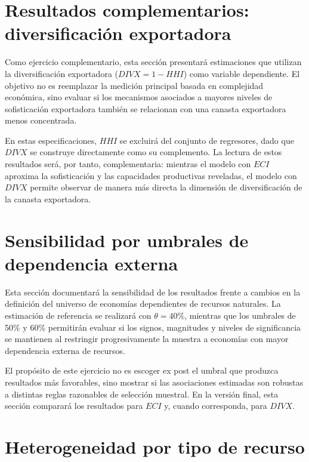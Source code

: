 \documentclass[../../PTFM.tex]{subfiles}
\begin{document}
	\section{Resultados complementarios: diversificación exportadora}
	\label{sec:resultados-divx}

	Como ejercicio complementario, esta sección presentará estimaciones que utilizan la diversificación exportadora ($DIVX=1-HHI$) como variable dependiente. El objetivo no es reemplazar la medición principal basada en complejidad económica, sino evaluar si los mecanismos asociados a mayores niveles de sofisticación exportadora también se relacionan con una canasta exportadora menos concentrada.

	En estas especificaciones, $HHI$ se excluirá del conjunto de regresores, dado que $DIVX$ se construye directamente como su complemento. La lectura de estos resultados será, por tanto, complementaria: mientras el modelo con $ECI$ aproxima la sofisticación y las capacidades productivas reveladas, el modelo con $DIVX$ permite observar de manera más directa la dimensión de diversificación de la canasta exportadora.


	\section{Sensibilidad por umbrales de dependencia externa}
	\label{sec:sensibilidad-umbrales}

	Esta sección documentará la sensibilidad de los resultados frente a cambios en la definición del universo de economías dependientes de recursos naturales. La estimación de referencia se realizará con $\theta=40\%$, mientras que los umbrales de 50\% y 60\% permitirán evaluar si los signos, magnitudes y niveles de significancia se mantienen al restringir progresivamente la muestra a economías con mayor dependencia externa de recursos.

	El propósito de este ejercicio no es escoger ex post el umbral que produzca resultados más favorables, sino mostrar si las asociaciones estimadas son robustas a distintas reglas razonables de selección muestral. En la versión final, esta sección comparará los resultados para $ECI$ y, cuando corresponda, para $DIVX$.


	\section{Heterogeneidad por tipo de recurso}
	\label{sec:heterogeneidad-recurso}
\end{document}
